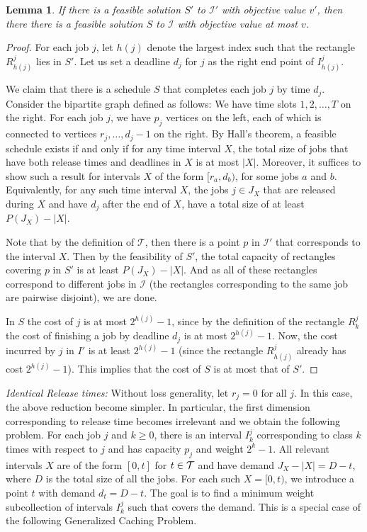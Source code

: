 \documentclass[11pt]{article}
\newtheorem{lemma}[thm]{Lemma}
\begin{document}
\begin{lemma}
\label{s:gc}
If there is a feasible solution $S'$ to $\mathcal I'$ 
with objective value $v'$, 
then there there is a feasible solution $S$ to $\mathcal I$
with objective value at most $v$.
\end{lemma}
\begin{proof}
For each job $j$, let $h(j)$ denote the largest index such that the rectangle $R^j_{h(j)}$ lies in $S'$.
Let us set a deadline $d_j$ for $j$ as the right end point of $I^j_{h(j)}$. 


We claim that there is a schedule $S$ that completes each job
$j$ by time $d_j$. Consider the bipartite graph defined as follows: We have time slots $1,2,\ldots,T$ on the right. For each job $j$, we have
$p_j$ vertices on the left, each of which is connected to vertices $r_j,\ldots,d_j-1$ on the right.
By Hall's theorem, a feasible schedule exists if and only if for any time interval $X$, the total size of jobs
that have both release times and deadlines in $X$ is at most $|X|$.
Moreover, it suffices to show such a result for intervals $X$ of the form 
$[r_a,d_b)$, for some jobs $a$ and $b$.
Equivalently, for any such time interval $X$, 
the jobs $j \in J_X$ that are released during $X$ and have $d_j$ after the end of $X$,
have a total size of at least $P(J_X) - |X|$. 
 
Note that by the definition of $\mathcal T$, then there is a point
$p$ in $\mathcal I'$ that corresponds to the interval $X$.
Then by the feasibility of $S'$, 
the total capacity of rectangles covering $p$ in $S'$
is at least $P(J_X) - |X|$. And as all of these rectangles 
correspond to different jobs in $\mathcal I$ (the rectangles corresponding to the same job are pairwise disjoint), we are done.


In $S$ the cost of $j$ is at most $2^{h(j)}-1$, since by the definition of the rectangle $R^j_k$ the cost of finishing a job by deadline $d_j$ is at most $2^{h(j)}-1$. Now, the cost incurred by $j$ in $I'$ is at least $2^{h(j)}-1$ (since the rectangle $R^j_{h(j)}$ already has cost $2^{h(j)}-1$). This implies that the cost of $S$ is at most that of $S'$.
\end{proof}

\bigskip

{\em Identical Release times:}
Without loss generality, let $r_j=0$ for all $j$. In this case, the above reduction become simpler. In particular, the first dimension corresponding to release time becomes irrelevant and we obtain the following problem. For each job $j$ and $k\geq 0$, there is an interval $I^j_k$ corresponding to class $k$ times with respect to $j$ and has capacity $p_j$ and weight $2^{k}-1$.
All relevant intervals $X$ are of the form 
$[0,t]$ for $t \in \cal{T}$ and have demand $J_X-|X|=D-t$, where $D$ is the total size of all the jobs. 
For each such $X=[0,t)$, we introduce a point $t$ with demand $d_t=D-t$.
The goal is to find a minimum weight subcollection of intervals $I^j_k$ such that covers the demand.
This is a special case of the following Generalized Caching Problem.
\end{document}
